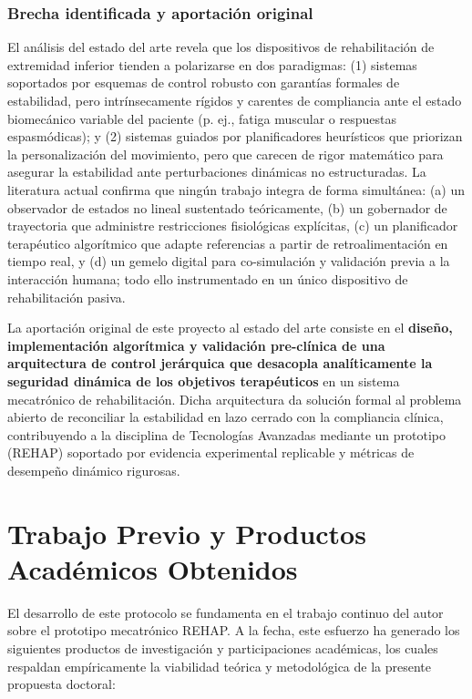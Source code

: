 \documentclass[a4paper,12pt]{article}
\begin{document}
\subsubsection{Brecha identificada y aportación original}

El análisis del estado del arte revela que los dispositivos de rehabilitación de extremidad inferior tienden a polarizarse en dos paradigmas: (1) sistemas soportados por esquemas de control robusto con garantías formales de estabilidad, pero intrínsecamente rígidos y carentes de compliancia ante el estado biomecánico variable del paciente (p. ej., fatiga muscular o respuestas espasmódicas); y (2) sistemas guiados por planificadores heurísticos que priorizan la personalización del movimiento, pero que carecen de rigor matemático para asegurar la estabilidad ante perturbaciones dinámicas no estructuradas. La literatura actual confirma que ningún trabajo integra de forma simultánea: (a) un observador de estados no lineal sustentado teóricamente, (b) un gobernador de trayectoria que administre restricciones fisiológicas explícitas, (c) un planificador terapéutico algorítmico que adapte referencias a partir de retroalimentación en tiempo real, y (d) un gemelo digital para co-simulación y validación previa a la interacción humana; todo ello instrumentado en un único dispositivo de rehabilitación pasiva.

La aportación original de este proyecto al estado del arte consiste en el \textbf{diseño, implementación algorítmica y validación pre-clínica de una arquitectura de control jerárquica que desacopla analíticamente la seguridad dinámica de los objetivos terapéuticos} en un sistema mecatrónico de rehabilitación. Dicha arquitectura da solución formal al problema abierto de reconciliar la estabilidad en lazo cerrado con la compliancia clínica, contribuyendo a la disciplina de Tecnologías Avanzadas mediante un prototipo (REHAP) soportado por evidencia experimental replicable y métricas de desempeño dinámico rigurosas.

\newpage
\section{Trabajo Previo y Productos Académicos Obtenidos}

El desarrollo de este protocolo se fundamenta en el trabajo continuo del autor sobre el prototipo mecatrónico REHAP. A la fecha, este esfuerzo ha generado los siguientes productos de investigación y participaciones académicas, los cuales respaldan empíricamente la viabilidad teórica y metodológica de la presente propuesta doctoral:
\end{document}

